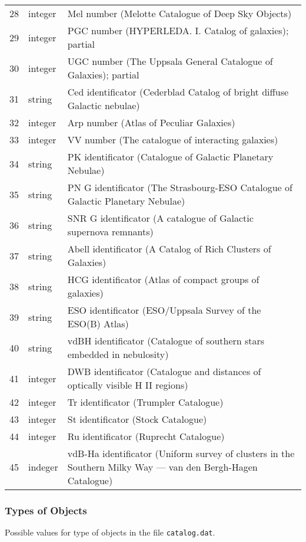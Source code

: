 \begin{longtable}{r|l|p{110mm}}
28 & integer & Mel number (Melotte Catalogue of Deep Sky Objects)\\
29 & integer & PGC number (HYPERLEDA. I. Catalog of galaxies); partial\\
30 & integer & UGC number (The Uppsala General Catalogue of Galaxies); partial\\
31 & string  & Ced identificator (Cederblad Catalog of bright diffuse Galactic nebulae)\\
32 & integer & Arp number (Atlas of Peculiar Galaxies)\\
33 & integer & VV number (The catalogue of interacting galaxies)\\
34 & string  & PK identificator (Catalogue of Galactic Planetary Nebulae)\\
35 & string  & PN G identificator (The Strasbourg-ESO Catalogue of Galactic Planetary Nebulae)\\
36 & string  & SNR G identificator (A catalogue of Galactic supernova remnants)\\
37 & string  & Abell identificator (A Catalog of Rich Clusters of Galaxies)\\
38 & string  & HCG identificator (Atlas of compact groups of galaxies)\\
39 & string  & ESO identificator (ESO/Uppsala Survey of the ESO(B) Atlas)\\
40 & string  & vdBH identificator (Catalogue of southern stars embedded in nebulosity)\\
41 & integer & DWB identificator (Catalogue and distances of optically visible H II regions)\\
42 & integer & Tr identificator (Trumpler Catalogue)\\
43 & integer & St identificator (Stock Catalogue)\\
44 & integer & Ru identificator (Ruprecht Catalogue)\\
45 & indeger & vdB-Ha identificator (Uniform survey of clusters in the Southern Milky Way --- van den Bergh-Hagen Catalogue)\\
\bottomrule
\end{longtable}

\subsubsection{Types of Objects}
\label{sec:dso:types}

Possible values for type of objects in the file \texttt{catalog.dat}.

